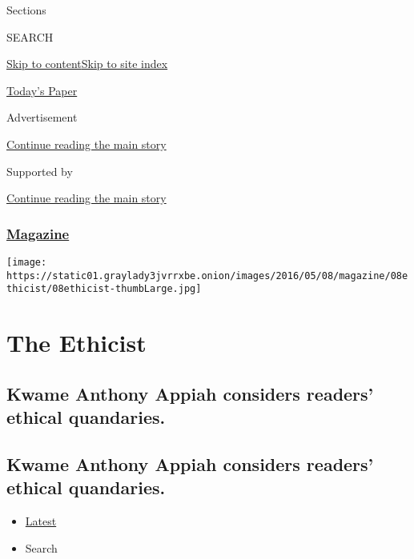 Sections

SEARCH

\protect\hyperlink{site-content}{Skip to
content}\protect\hyperlink{site-index}{Skip to site index}

\href{https://myaccount.nytimes3xbfgragh.onion/auth/login?response_type=cookie\&client_id=vi}{}

\href{https://www.nytimes3xbfgragh.onion/section/todayspaper}{Today's
Paper}

Advertisement

\protect\hyperlink{after-top}{Continue reading the main story}

Supported by

\protect\hyperlink{after-sponsor}{Continue reading the main story}

\hypertarget{magazine}{%
\subsubsection{\texorpdfstring{\href{/section/magazine}{Magazine}}{Magazine}}\label{magazine}}

\texttt{[image: https://static01.graylady3jvrrxbe.onion/images/2016/05/08/magazine/08ethicist/08ethicist-thumbLarge.jpg]}

\hypertarget{the-ethicist}{%
\section{The Ethicist}\label{the-ethicist}}

\hypertarget{kwame-anthony-appiah-considers-readers-ethical-quandaries}{%
\subsection{Kwame Anthony Appiah considers readers' ethical
quandaries.}\label{kwame-anthony-appiah-considers-readers-ethical-quandaries}}

\hypertarget{kwame-anthony-appiah-considers-readers-ethical-quandaries-1}{%
\subsection{Kwame Anthony Appiah considers readers' ethical
quandaries.}\label{kwame-anthony-appiah-considers-readers-ethical-quandaries-1}}

\begin{itemize}
\tightlist
\item
  \protect\hyperlink{stream-panel}{Latest}
\item
  Search
\end{itemize}


